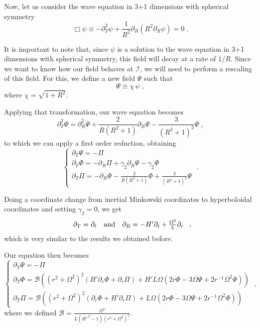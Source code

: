Now, let us consider the wave equation in 3+1 dimensions with spherical symmetry
\begin{equation}
    \Box \psi \equiv - \partial_T^2 \psi + \frac{1}{R^2} \partial_R\left( R^2 \partial_R \psi\right) = 0 \;.
\end{equation}

It is important to note that, since $\psi$ is a solution to the wave equation in 3+1 dimensions with spherical symmetry, this field will decay at a rate of $1/R$. Since we want to know how our field behaves at $\mathscr{I}$, we will need to perform a rescaling of this field. For this, we define a new field $\Psi$ such that
$$\Psi \equiv \chi \, \psi \; ,$$
where $\chi = \sqrt{1+R^2}$.

Applying that transformation, our wave equation becomes
\begin{equation}
    \partial_T^2 \Psi = \partial_R^2\Psi + \frac{2}{R(R^2+1)} \partial_R\Psi - \frac{3}{(R^2+1)^2} \Psi \;,
\end{equation}
to which we can apply a first order reduction, obtaining
\begin{equation}
    \left\{ \begin{array}{l} 
        \partial_T \Psi = - \Pi \\ 
        \partial_T \Phi = - \partial_R \Pi + \gamma_2 \partial_R \Psi - \gamma_2\Phi\\
        \partial_T \Pi = - \partial_R \Phi - \frac{2}{R(R^2+1)}\Phi + \frac{3}{(R^2+1)^2} \Psi
    \end{array} \right. \; .
\end{equation}

Doing a coordinate change from inertial Minkowski coordinates to hyperboloidal coordinates and setting $\gamma_2 = 0$, we get
\begin{equation}
    \begin{array}{c c c}
        \partial_T = \partial_t & \text{and} & \partial_R = - H' \partial_t + \frac{\Omega^2}{L} \partial_r
    \end{array} \; ,
\end{equation}
which is very similar to the results we obtained before.

Our equation then becomes
\begin{equation}
    \left\{ \begin{array}{l} 
        \partial_T \Psi = - \Pi \\ 
        \partial_T \Phi = \mathcal{B}\left((r^2 + \Omega^2)^2 \left(H' \partial_r \Phi + \partial_r\Pi\right) + H' L \Omega \left( 2r\Phi - 3 \Omega \Psi + 2 r^{-1} \Omega^2 \Phi\right)\right)\\
        \partial_T \Pi = \mathcal{B}\left((r^2 + \Omega^2)^2 \left(\partial_r \Phi + H' \partial_r\Pi\right) + L \Omega \left( 2r\Phi - 3 \Omega \Psi + 2 r^{-1} \Omega^2 \Phi\right)\right)
    \end{array} \right. \; ,
\end{equation}
where we defined $\mathcal{B}= \frac{\Omega^2}{L(H'^{\,2}-1)(r^2 + \Omega^2)^2}$. 

